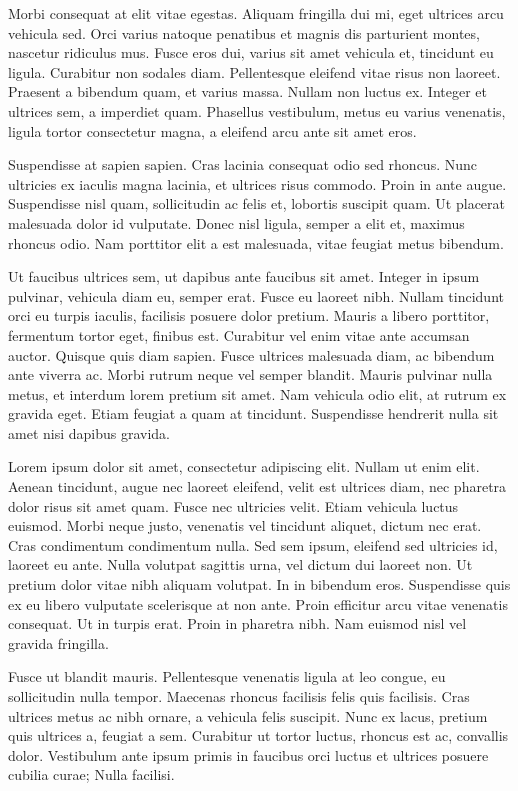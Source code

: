 Morbi consequat at elit vitae egestas. Aliquam fringilla dui mi, eget ultrices arcu vehicula sed. Orci varius natoque penatibus et magnis dis parturient montes, nascetur ridiculus mus. Fusce eros dui, varius sit amet vehicula et, tincidunt eu ligula. Curabitur non sodales diam. Pellentesque eleifend vitae risus non laoreet. Praesent a bibendum quam, et varius massa. Nullam non luctus ex. Integer et ultrices sem, a imperdiet quam. Phasellus vestibulum, metus eu varius venenatis, ligula tortor consectetur magna, a eleifend arcu ante sit amet eros.

Suspendisse at sapien sapien. Cras lacinia consequat odio sed rhoncus. Nunc ultricies ex iaculis magna lacinia, et ultrices risus commodo. Proin in ante augue. Suspendisse nisl quam, sollicitudin ac felis et, lobortis suscipit quam. Ut placerat malesuada dolor id vulputate. Donec nisl ligula, semper a elit et, maximus rhoncus odio. Nam porttitor elit a est malesuada, vitae feugiat metus bibendum.

Ut faucibus ultrices sem, ut dapibus ante faucibus sit amet. Integer in ipsum pulvinar, vehicula diam eu, semper erat. Fusce eu laoreet nibh. Nullam tincidunt orci eu turpis iaculis, facilisis posuere dolor pretium. Mauris a libero porttitor, fermentum tortor eget, finibus est. Curabitur vel enim vitae ante accumsan auctor. Quisque quis diam sapien. Fusce ultrices malesuada diam, ac bibendum ante viverra ac. Morbi rutrum neque vel semper blandit. Mauris pulvinar nulla metus, et interdum lorem pretium sit amet. Nam vehicula odio elit, at rutrum ex gravida eget. Etiam feugiat a quam at tincidunt. Suspendisse hendrerit nulla sit amet nisi dapibus gravida.

Lorem ipsum dolor sit amet, consectetur adipiscing elit. Nullam ut enim elit. Aenean tincidunt, augue nec laoreet eleifend, velit est ultrices diam, nec pharetra dolor risus sit amet quam. Fusce nec ultricies velit. Etiam vehicula luctus euismod. Morbi neque justo, venenatis vel tincidunt aliquet, dictum nec erat. Cras condimentum condimentum nulla. Sed sem ipsum, eleifend sed ultricies id, laoreet eu ante. Nulla volutpat sagittis urna, vel dictum dui laoreet non. Ut pretium dolor vitae nibh aliquam volutpat. In in bibendum eros. Suspendisse quis ex eu libero vulputate scelerisque at non ante. Proin efficitur arcu vitae venenatis consequat. Ut in turpis erat. Proin in pharetra nibh. Nam euismod nisl vel gravida fringilla.

Fusce ut blandit mauris. Pellentesque venenatis ligula at leo congue, eu sollicitudin nulla tempor. Maecenas rhoncus facilisis felis quis facilisis. Cras ultrices metus ac nibh ornare, a vehicula felis suscipit. Nunc ex lacus, pretium quis ultrices a, feugiat a sem. Curabitur ut tortor luctus, rhoncus est ac, convallis dolor. Vestibulum ante ipsum primis in faucibus orci luctus et ultrices posuere cubilia curae; Nulla facilisi.

